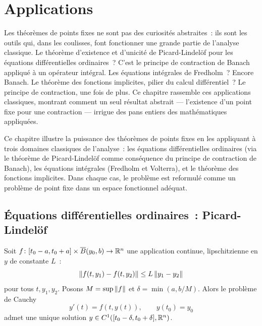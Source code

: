 \chapter{Applications}
\label{ch:applications}

Les th\'eor\`emes de points fixes ne sont pas des curiosit\'es abstraites~: ils sont les outils qui, dans les coulisses, font fonctionner une grande partie de l'analyse classique. Le th\'eor\`eme d'existence et d'unicit\'e de Picard-Lindel\"of pour les \'equations diff\'erentielles ordinaires~? C'est le principe de contraction de Banach appliqu\'e \`a un op\'erateur int\'egral. Les \'equations int\'egrales de Fredholm~? Encore Banach. Le th\'eor\`eme des fonctions implicites, pilier du calcul diff\'erentiel~? Le principe de contraction, une fois de plus. Ce chapitre rassemble ces applications classiques, montrant comment un seul r\'esultat abstrait --- l'existence d'un point fixe pour une contraction --- irrigue des pans entiers des math\'ematiques appliqu\'ees.

\begin{intuition}
Ce chapitre illustre la puissance des th\'eor\`emes de points fixes en les appliquant \`a
trois domaines classiques de l'analyse~: les \'equations diff\'erentielles ordinaires (via
le th\'eor\`eme de Picard-Lindel\"of comme cons\'equence du principe de contraction de
Banach), les \'equations int\'egrales (Fredholm et Volterra), et le th\'eor\`eme des
fonctions implicites. Dans chaque cas, le probl\`eme est reformul\'e comme un probl\`eme de
point fixe dans un espace fonctionnel ad\'equat.
\end{intuition}

\section{\'Equations diff\'erentielles ordinaires~: Picard-Lindel\"of}

\begin{theoreme}
\label{thm:picard-lindelof}
Soit $f\colon [t_0 - a, t_0 + a] \times \overline{B}(y_0, b) \to \mathbb{R}^n$ une application
continue, lipschitzienne en $y$ de constante $L$~:
\[
  \left\| f(t, y_1) - f(t, y_2) \right\| \leq L \left\| y_1 - y_2 \right\|
\]
pour tous $t, y_1, y_2$. Posons $M = \sup \left\| f \right\|$ et $\delta = \min(a, b/M)$.
Alors le probl\`eme de Cauchy
\[
  y'(t) = f(t, y(t)), \qquad y(t_0) = y_0
\]
admet une unique solution $y \in C^1([t_0 - \delta, t_0 + \delta], \mathbb{R}^n)$.
\end{theoreme}

